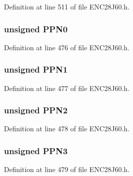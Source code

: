 Definition at line 511 of file E\+N\+C28\+J60.\+h.

\hypertarget{union_p_h_y_r_e_g_a873d572c5939b9e90f4c98158fd0f063}{}
\subsubsection[{P\+P\+N0}]{\setlength{\rightskip}{0pt plus 5cm}unsigned P\+P\+N0}\label{union_p_h_y_r_e_g_a873d572c5939b9e90f4c98158fd0f063}


Definition at line 476 of file E\+N\+C28\+J60.\+h.

\hypertarget{union_p_h_y_r_e_g_acf86a44dbbf46a2f4936d6b69de7d8b5}{}
\subsubsection[{P\+P\+N1}]{\setlength{\rightskip}{0pt plus 5cm}unsigned P\+P\+N1}\label{union_p_h_y_r_e_g_acf86a44dbbf46a2f4936d6b69de7d8b5}


Definition at line 477 of file E\+N\+C28\+J60.\+h.

\hypertarget{union_p_h_y_r_e_g_a46ab63e273d37dda2163660f698e1ad3}{}
\subsubsection[{P\+P\+N2}]{\setlength{\rightskip}{0pt plus 5cm}unsigned P\+P\+N2}\label{union_p_h_y_r_e_g_a46ab63e273d37dda2163660f698e1ad3}


Definition at line 478 of file E\+N\+C28\+J60.\+h.

\hypertarget{union_p_h_y_r_e_g_a1e886b5238a6d5d21a53064d4b43903c}{}
\subsubsection[{P\+P\+N3}]{\setlength{\rightskip}{0pt plus 5cm}unsigned P\+P\+N3}\label{union_p_h_y_r_e_g_a1e886b5238a6d5d21a53064d4b43903c}


Definition at line 479 of file E\+N\+C28\+J60.\+h.

